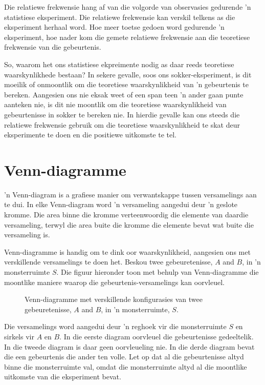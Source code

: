 Die relatiewe frekwensie hang af van die volgorde van observasies gedurende 'n statistiese eksperiment. Die relatiewe frekwensie kan verskil telkens as die eksperiment herhaal word. Hoe meer toetse gedoen word gedurende 'n eksperiment, hoe nader kom die gemete relatiewe frekwensie aan die teoretiese frekwensie van die gebeurtenis.

So, waarom het ons statistiese ekpreimente nodig as daar reeds teoretiese waarskynlikhede bestaan? In sekere gevalle, soos ons sokker-eksperiment, is dit moeilik of onmoontlik om die teoretiese waarskynlikheid van 'n gebeurtenis te bereken. Aangesien ons nie eksak weet of een span teen 'n ander gaan punte aanteken nie, is dit nie moontlik om die teoretiese waarskynlikheid van gebeurtenisse in sokker te bereken nie. In hierdie gevalle kan ons steeds die relatiewe frekwensie gebruik om die teoretiese waarskynlikheid te skat deur eksperimente te doen en die positiewe uitkomste te tel.

\section{Venn-diagramme}
'n Venn-diagram is a grafiese manier om verwantskappe tussen versamelings aan te dui. In elke Venn-diagram word 'n versameling aangedui deur 'n geslote kromme. Die area binne die kromme verteenwoordig die elemente van daardie versameling, terwyl die area buite die kromme die elemente bevat wat buite die versameling is.

Venn-diagramme is handig om te dink oor waarskynlikheid, aangesien ons met verskillende versamelings te doen het. Beskou twee gebeuretenisse, $A$ and $B$, in 'n monsterruimte $S$. Die figuur hieronder toon met behulp van Venn-diagramme die moontlike maniere waarop die gebeurtenis-versamelings kan oorvleuel.


\begin{figure}[h]
  
  \caption{Venn-diagramme met verskillende konfigurasies van twee gebeuretenisse, $A$ and $B$, in 'n monsterruimte, $S$.}
\end{figure}

Die versamelings word aangedui deur 'n reghoek vir die monsterruimte $S$ en sirkels vir $A$ en $B$. In die eerste diagram oorvleuel die gebeurtenisse gedeeltelik. In die tweede diagram is daar geen oorvleueling nie. In die derde diagram bevat die een gebeurtenis die ander ten volle. Let op dat al die gebeurtenisse altyd binne die monsterruimte val, omdat die monsterruimte altyd al die moontlike uitkomste van die eksperiment bevat.

